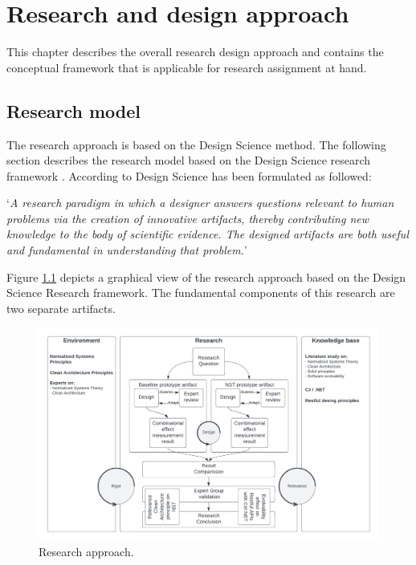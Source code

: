 \chapter{Research and design approach} \label{research_and_design_approach}

This chapter describes the overall research design approach and contains the conceptual
framework that is applicable for research assignment at hand. 

\section{Research model}
The research approach is based on the Design Science method. The following section
describes the research model based on the Design Science research framework \parencite[(P.
107)]{recker_scientific_2013}. According to \citeauthor{recker_scientific_2013} Design
Science has been formulated as followed:

\begin{center}
    \enquote*{\textit{A research paradigm in which a designer answers questions relevant
    to human problems via the creation of innovative artifacts, thereby contributing new
    knowledge to the body of scientific evidence. The designed artifacts are both useful
    and fundamental in understanding that problem.}}
\end{center}
Figure \ref{fig:reserach_approach} depicts a graphical view of the research approach based
on the Design Science Research framework. The fundamental components of this research are
two separate artifacts. 

\begin{figure}[!h]
    \centering
    \includegraphics[width=1\textwidth]{Figures/research_approach}
    \caption[Research approach]{Research approach.}
    \label{fig:reserach_approach}
\end{figure}

